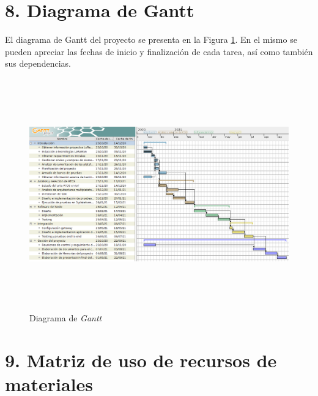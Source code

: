 \documentclass[11pt]{charter}
\begin{document}
\section{8. Diagrama de Gantt}
\label{sec:gantt}

El diagrama de Gantt del proyecto se presenta en la Figura \ref{fig:Gantt}. En el mismo se pueden apreciar las fechas de inicio y finalización de cada tarea, así como también sus dependencias.

\begin{figure}[htpb]
\centering 
\includegraphics[width=16cm, height=10cm]{./Figuras/gantt.png}
\caption{Diagrama de \textit{Gantt}}
\label{fig:Gantt}
\end{figure}

\section{9. Matriz de uso de recursos de materiales}
\label{sec:recursos}
\end{document}
